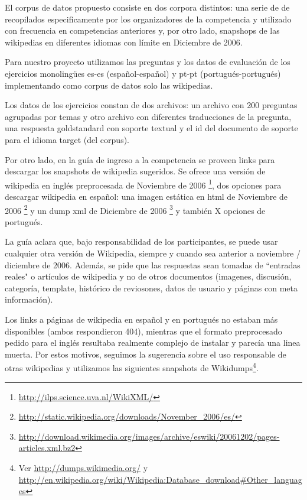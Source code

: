 El corpus de datos propuesto consiste en dos corpora distintos: una serie de de recopilados especificamente por los organizadores de la competencia y utilizado con frecuencia en competencias anteriores y, por otro lado, snapshops de las wikipedias en diferentes idiomas con límite en Diciembre de 2006.

Para nuestro proyecto utilizamos las preguntas y los datos de evaluación de los ejercicios monolingües es-es (español-español) y pt-pt (portugués-portugués) implementando como corpus de datos solo las wikipedias.

Los datos de los ejercicios constan de dos archivos: un archivo con 200 preguntas agrupadas por temas y otro archivo con diferentes traducciones de la pregunta, una respuesta goldstandard con soporte textual y el id del documento de soporte para el idioma target (del corpus). 

Por otro lado, en la guía de ingreso a la competencia\cite{GuidelineClef07} se proveen links para descargar los snapshots de wikipedia sugeridos. Se ofrece una versión de wikipedia en inglés preprocesada de Noviembre de 2006 \footnote{\url{http://ilps.science.uva.nl/WikiXML/}}, dos opciones para descargar wikipedia en español: una imagen estática en html de Noviembre de 2006 \footnote{\url{http://static.wikipedia.org/downloads/November_2006/es/}} y un dump xml de Diciembre de 2006 \footnote{\url{http://download.wikimedia.org/images/archive/eswiki/20061202/pages-articles.xml.bz2}} y también X opciones de portugués.

La guía aclara que, bajo responsabilidad de los participantes, se puede usar
cualquier otra versión de Wikipedia, siempre y cuando sea anterior a noviembre / diciembre de 2006.
Además, se pide que las respuestas sean tomadas de ``entradas reales" o artículos de wikipedia y
no de otros documentos (imagenes, discusión, categoría, template, histórico de reviosones, datos de usuario y páginas con meta información).

Los links a páginas de wikipedia en español y en portugués no estaban más disponibles (ambos respondieron 404), mientras que el formato
preprocesado pedido para el inglés resultaba realmente complejo de instalar y parecía una linea muerta. Por estos motivos,
seguimos la sugerencia sobre el uso responsable de otras wikipedias y utilizamos las siguientes snapshots de Wikidumps\footnote{Ver \url{http://dumps.wikimedia.org/} y \url{http://en.wikipedia.org/wiki/Wikipedia:Database_download\#Other_languages}}.

